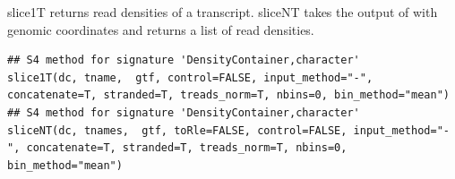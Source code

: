 \documentclass[letterpaper]{book}
\begin{document}
%
\begin{Description}

slice1T returns read densities of a transcript. sliceNT takes the output of with 
genomic coordinates and returns a list of read densities. 

\end{Description}
%
\begin{Usage}
\begin{verbatim}
## S4 method for signature 'DensityContainer,character'
slice1T(dc, tname,  gtf, control=FALSE, input_method="-", concatenate=T, stranded=T, treads_norm=T, nbins=0, bin_method="mean")
## S4 method for signature 'DensityContainer,character'
sliceNT(dc, tnames,  gtf, toRle=FALSE, control=FALSE, input_method="-", concatenate=T, stranded=T, treads_norm=T, nbins=0, bin_method="mean")
\end{verbatim}
\end{Usage}
%
\end{document}
